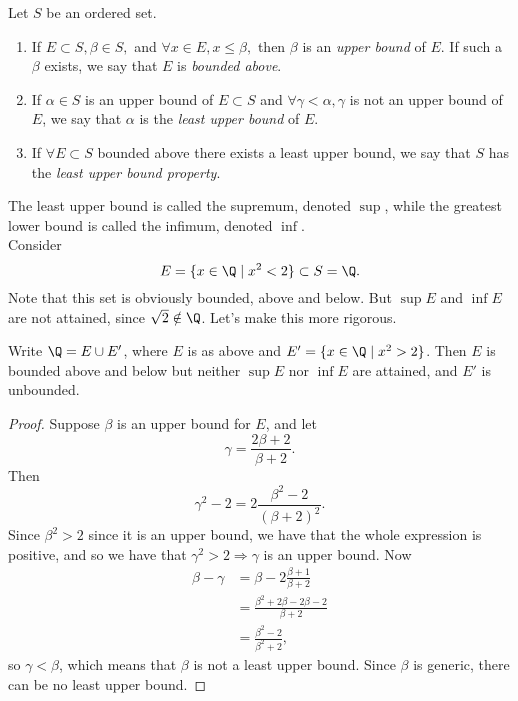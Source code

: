 \documentclass{notes}
\begin{document}
Let $S$ be an ordered set. 
\begin{enumerate}
  \item If $E\subset S, \beta\in S,$ and $\forall x\in E, x\leq\beta,$ then $\beta$ is an \emph{upper bound}
    of $E$. If such a $\beta$ exists, we say that $E$ is \emph{bounded above}.
  \item If $\alpha\in S$ is an upper bound of $E\subset S$ and $\forall \gamma < \alpha, \gamma$ is not
    an upper bound of $E$, we say that $\alpha$ is the \emph{least upper bound} of $E$.
  \item If $\forall E\subset S$ bounded above there exists a least upper bound, we say that $S$ has the
    \emph{least upper bound property}.
\end{enumerate}
The least upper bound is called the supremum, denoted $\sup$, while the greatest lower bound is called the
infimum, denoted $\inf$. \\

Consider $$E = \{x\in\Q \mid x^2 < 2 \} \subset S = \Q.$$ Note that this set is obviously bounded, above
and below. But $\sup E$ and $\inf E$ are not attained, since $\sqrt{2}\notin\Q$. Let's make this more
rigorous. \\

\begin{proposition}
  Write $\Q = E\cup E'$, where $E$ is as above and $E' = \{x\in\Q \mid x^2 > 2\}$. Then $E$ is bounded
  above and below but neither $\sup E$ nor $\inf E$ are attained, and $E'$ is unbounded.
\end{proposition}

\begin{proof}
  Suppose $\beta$ is an upper bound for $E$, and let $$\gamma = \frac{2\beta + 2}{\beta + 2}.$$ Then
  $$\gamma^2 - 2 = 2\frac{\beta^2 - 2}{(\beta + 2)^2}.$$ Since $\beta^2 > 2$ since it is an upper bound,
  we have that the whole expression is positive, and so we have that $\gamma^2 > 2 \Rightarrow \gamma$ is 
  an upper bound. Now 
  \begin{align*}
    \beta - \gamma &= \beta - 2\frac{\beta + 1}{\beta + 2} \\
                   &= \frac{\beta^2 + 2\beta - 2\beta - 2}{\beta + 2} \\
                   &= \frac{\beta^2 - 2}{\beta^2 + 2},
  \end{align*}
  so $\gamma < \beta$, which means that $\beta$ is not a least upper bound. Since $\beta$ is generic,
  there can be no least upper bound.
\end{proof}
\end{document}
